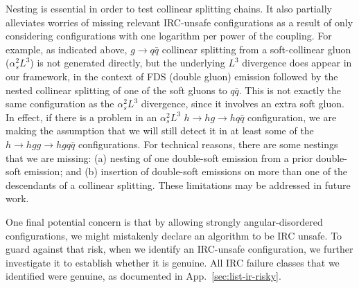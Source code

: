 \documentclass[nofootinbib,twocolumn,preprintnumbers,superscriptaddress,aps]{revtex4-2}
\newcommand{\as}{\alpha_s}
\begin{document}
Nesting is essential in order to test collinear splitting chains.
%
It also partially alleviates worries of missing relevant IRC-unsafe
configurations as a result of only considering configurations with one
logarithm per power of the coupling.
%
For example, as indicated above, $g \to q\bar q$ collinear splitting
from a soft-collinear gluon ($\as^2 L^3$) is not generated directly,
but the underlying $L^3$ divergence does appear in our framework, in
the context of FDS (double gluon) emission followed by the nested
collinear splitting of one of the soft gluons to $q\bar q$.
%
This is not exactly the same configuration as the $\as^2 L^3$
divergence, since it involves an extra soft gluon.
%
In effect, if there is a problem in an $\as^2 L^3$
$h \to hg \to hq\bar q$ configuration, we are making the assumption
that we will still detect it in at least some of the
$h \to hgg \to h gq\bar q$ configurations.
%
For technical reasons, there are some nestings that we are missing: (a)
nesting of one double-soft emission from a prior double-soft emission;
and (b) insertion of double-soft emissions on more than one of the
descendants of a collinear splitting.
%
These limitations may be addressed in future work.

One final potential concern is that by allowing strongly
angular-disordered configurations, we might mistakenly declare an
algorithm to be IRC unsafe.
%
To guard against that risk, when we identify an IRC-unsafe
configuration, we further investigate it to establish whether it is
genuine.
%
All IRC failure classes that we identified were genuine, as
documented in App.~\ref{sec:list-ir-risky}.
\end{document}
